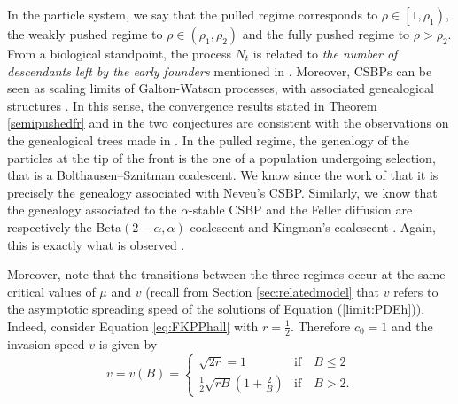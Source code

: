 \documentclass[11pt]{article}
\theoremstyle{plain}
\begin{document}
In the particle system, we say that the pulled regime corresponds to  $\rho\in\left[1,\rho_1\right)$, the weakly pushed regime to $\rho\in(\rho_1,\rho_2)$ and the fully pushed regime to $\rho>\rho_2$. From a biological standpoint, the process $N_t$ is related to \emph{the number of descendants left by the early founders} mentioned in \cite{Birzu:2020up}. Moreover, CSBPs can be seen as scaling limits of Galton-Watson processes, with  associated genealogical structures \cite{berestycki2009recent}. In this sense, the convergence results stated in Theorem \ref{semipushedfr} and in the two conjectures are consistent with the observations on the genealogical trees made in \cite{Birzu:2020up}. In the pulled regime, the genealogy of the particles at the tip of the front  is the one of a population undergoing selection, that is a Bolthausen--Sznitman coalescent. We know since the work of  \cite{bertoin2000bolthausen} that it is precisely the genealogy associated with Neveu's CSBP. Similarly, we know that the genealogy associated to the $\alpha$-stable CSBP and the Feller diffusion are respectively the Beta$(2-\alpha,\alpha)$-coalescent and Kingman's coalescent \cite{Birkner2005}. Again, this is exactly what is observed \cite{Birzu:2020up}.

Moreover, note that the transitions between the three regimes occur at the same critical values of $\mu$ and $v$ (recall from Section \ref{sec:relatedmodel} that $v$ refers to the asymptotic spreading speed of the solutions of Equation (\ref{limit:PDEh})). Indeed, consider Equation \eqref{eq:FKPPhall} with $r=\frac{1}{2}$. Therefore $c_0=1$ and the invasion speed $v$ is given by \cite{Hadeler:1975uk}
\begin{equation}
v=v(B)=\begin{cases}\label{eq:speedPDE}
\sqrt{2r}= 1 & \text{if} \quad B\leqslant 2\\
\frac{1}{2}\sqrt{rB}\left(1+\frac{2}{B}\right) & \text{if} \quad B>2.
\end{cases}
\end{equation}
\end{document}

